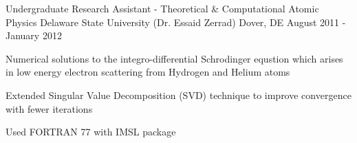\begin{cventries}
  \cventry
    {Undergraduate Research Assistant - Theoretical \& Computational Atomic Physics} %
    {Delaware State University (Dr. Essaid Zerrad)} %
    {Dover, DE} %
    {August 2011 - January 2012} %
    {
      \begin{cvitems} %
        \item {Numerical solutions to the integro-differential Schrodinger equstion which arises in low energy electron scattering from Hydrogen and Helium atoms}
        \item {Extended Singular Value Decomposition (SVD) technique to improve convergence with fewer iterations}
        \item {Used FORTRAN 77 with IMSL package}
      \end{cvitems}
    }

\end{cventries}
